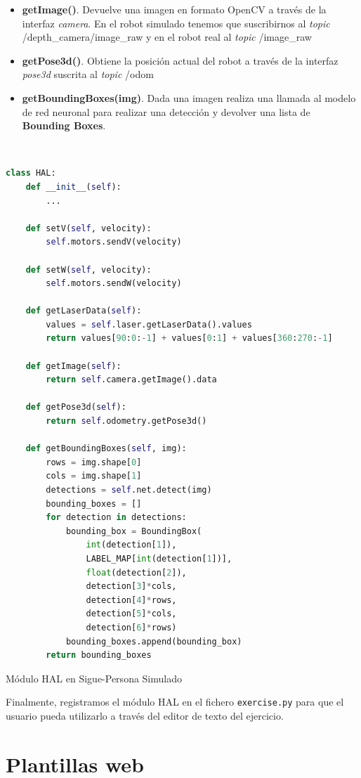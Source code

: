 \begin{itemize}
\begin{figure} [H]
  \label{fig:vista_planta_turtlebot2}
\end{figure}
	\item \textbf{getImage()}. Devuelve una imagen en formato OpenCV a través de la interfaz \textit{camera}. En el robot simulado tenemos que suscribirnos al \textit{topic} /depth\_camera/image\_raw y en el robot real al \textit{topic} /image\_raw
	\item \textbf{getPose3d()}. Obtiene la posición actual del robot a través de la interfaz \textit{pose3d} suscrita al \textit{topic} /odom
	\item \textbf{getBoundingBoxes(img)}. Dada una imagen realiza una llamada al modelo de red neuronal para realizar una detección y devolver una lista de \textbf{Bounding Boxes}.  
\end{itemize}\

\begin{code}[H]
\begin{lstlisting}[language=Python]
class HAL:
	def __init__(self):
		...
	
	def setV(self, velocity):
		self.motors.sendV(velocity)
    
	def setW(self, velocity):
		self.motors.sendW(velocity)

	def getLaserData(self):
		values = self.laser.getLaserData().values
		return values[90:0:-1] + values[0:1] + values[360:270:-1]

	def getImage(self):
		return self.camera.getImage().data

	def getPose3d(self):
		return self.odometry.getPose3d()

	def getBoundingBoxes(self, img):
		rows = img.shape[0]
		cols = img.shape[1]
		detections = self.net.detect(img)
		bounding_boxes = []
		for detection in detections:
			bounding_box = BoundingBox(
				int(detection[1]),
				LABEL_MAP[int(detection[1])],
				float(detection[2]),
				detection[3]*cols,
				detection[4]*rows,
				detection[5]*cols,
				detection[6]*rows)
			bounding_boxes.append(bounding_box)
		return bounding_boxes
\end{lstlisting}
\caption{Módulo HAL en Sigue-Persona Simulado}
\label{cod:sim_follow_person_hal}
\end{code}

Finalmente, registramos el módulo HAL en el fichero \texttt{exercise.py} para que el usuario pueda utilizarlo a través del editor de texto del ejercicio.\\


\section{Plantillas web}
\label{subsec:plantillas_web}

